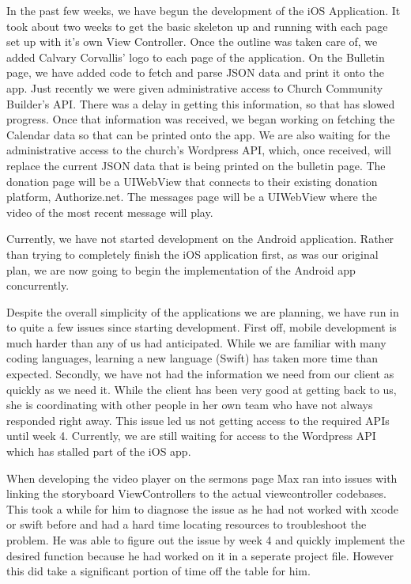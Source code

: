 \documentclass[letterpaper,10pt,draftclsnofoot,onecolumn,titlepage]{IEEEtran}
\begin{document}
		In the past few weeks, we have begun the development of the iOS Application. 
		It took about two weeks to get the basic skeleton up and running with each page set up with it's own View Controller. 
		Once the outline was taken care of, we added Calvary Corvallis' logo to each page of the application.
		On the Bulletin page, we have added code to fetch and parse JSON data and print it onto the app. 
		Just recently we were given administrative access to Church Community Builder's API. 
		There was a delay in getting this information, so that has slowed progress. 
		Once that information was received, we began working on fetching the Calendar data so that can be printed onto the app. 
		We are also waiting for the administrative access to the church's Wordpress API, which, once received, will replace the current JSON data that is being printed on the bulletin page. 
		The donation page will be a UIWebView that connects to their existing donation platform, Authorize.net. 
		The messages page will be a UIWebView where the video of the most recent message will play. 
		
		Currently, we have not started development on the Android application. 
		Rather than trying to completely finish the iOS application first, as was our original plan, we are now going to begin the implementation of the Android app concurrently. 
		
		Despite the overall simplicity of the applications we are planning, we have run in to quite a few issues since starting development. 
		First off, mobile development is much harder than any of us had anticipated. 
		While we are familiar with many coding languages, learning a new language (Swift) has taken more time than expected. 
		Secondly, we have not had the information we need from our client as quickly as we need it. 
		While the client has been very good at getting back to us, she is coordinating with other people in her own team who have not always responded right away. 
		This issue led us not getting access to the required APIs until week 4. 
		Currently, we are still waiting for access to the Wordpress API which has stalled part of the iOS app. 
		
		When developing the video player on the sermons page Max ran into issues with linking the storyboard ViewControllers to the actual viewcontroller codebases. 
		This took a while for him to diagnose the issue as he had not worked with xcode or swift before and had a hard time locating resources to troubleshoot the problem. 
		He was able to figure out the issue by week 4 and quickly implement the desired function because he had worked on it in a seperate project file.
		However this did take a significant portion of time off the table for him.
		
\end{document}
